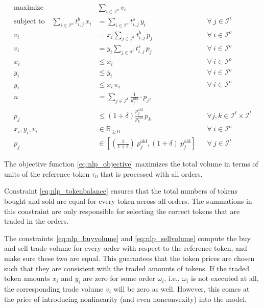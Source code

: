 \documentclass[11pt,parskip=full]{scrartcl}%
\newcommand*{\ie}{i.e., }
\newcommand*{\wrt}{with respect to }
\newcommand*{\itokens}{\mathcal{I}^t}       %
\newcommand*{\iorders}{\mathcal{I}^o}       %
\begin{document}
\begin{subequations}
\begin{align}
  \text{maximize} \quad & \sum\limits_{i \in \iorders} v_i
  \label{eq:nlp_objective}
  \\[2mm]
  \text{subject to} \quad
  \sum\limits_{i \in \iorders} t^b_{i,j} \, x_i
  &= \sum\limits_{i \in \iorders} t^s_{i,j} \, y_i
  && \forall \> j \in \itokens
  \label{eq:nlp_tokenbalance}
  \\[2mm]
  v_i
  &= x_i \sum\limits_{j \in \itokens} t^b_{i,j} \, p_j
  && \forall \> i \in \iorders
  \label{eq:nlp_buyvolume}
  \\[1mm]
  v_i
  &= y_i \sum\limits_{j \in \itokens} t^s_{i,j} \, p_j
  && \forall \> i \in \iorders
  \label{eq:nlp_sellvolume}
  \\[2mm]
  x_i &\le \overline{x}_i
  && \forall \> i \in \iorders
  \label{eq:nlp_tokenamount_1}
  \\[1mm]
  y_i &\le \overline{y}_i
  && \forall \> i \in \iorders
  \label{eq:nlp_tokenamount_2}
  \\[1mm]
  y_i &\le x_i \, \pi_i
  && \forall \> i \in \iorders
  \label{eq:nlp_tokenamount_3}
  \\[2mm]
  n
  &= \sum\limits_{j \in \itokens} \frac{1}{p^\mathrm{old}_j} \cdot p_j,
  \label{eq:nlp_reftoken}
  \\[1mm]
  p_j
  &\le \left(1+\delta\right) \frac{p^\mathrm{old}_j}{p^\mathrm{old}_k} \, p_k
  && \forall j,k \in \itokens \times \itokens
  \label{eq:nlp_maxfluct}
  \\[2mm]
  x_i, y_i, v_i &\in \mathbb{R}_{\ge 0}
  && \forall \> i \in \iorders
  \\[1mm]
  p_j
  &\in \left[ \left(\frac{1}{1+\delta}\right) \> p^\mathrm{old}_j, (1+\delta) \> p^\mathrm{old}_j
  \right]
  && \forall \> j \in \itokens
\end{align}
\label{eq:nlp}
\end{subequations}

The objective function \eqref{eq:nlp_objective} maximizes the total volume in terms of units of
the reference token $ \tau_0 $ that is processed with all orders.

Constraint \eqref{eq:nlp_tokenbalance} ensures that the total numbers of tokens bought and sold are
equal for every token across all orders.
The summations in this constraint are only responsible for selecting the correct tokens that are
traded in the orders.

The constraints~\eqref{eq:nlp_buyvolume} and \eqref{eq:nlp_sellvolume} compute the buy and sell
trade volume for every order \wrt the reference token, and make sure these two are equal.
This guarantees that the token prices are chosen such that they are consistent with the traded
amounts of tokens.
If the traded token amounts $ x_i $ and $ y_i $ are zero for some order $ \omega_i $, \ie
$ \omega_i $ is not executed at all, the corresponding trade volume $ v_i $ will be zero as well.
However, this comes at the price of introducing nonlinearity (and even nonconvexity) into the
model.
\end{document}
